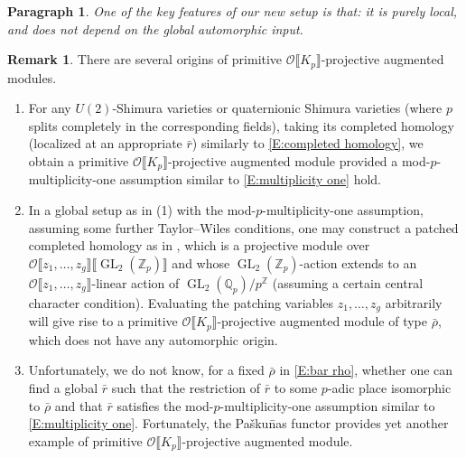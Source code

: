 \documentclass[12pt]{amsart}
\theoremstyle{definition}
\newtheorem{remark}[subsection]{Remark}
\newtheorem{para}[subsection]{Paragraph}
\numberwithin{equation}{subsection}
\def\calO{\mathcal{O}}
\def\QQ{\mathbb{Q}}
\def\ZZ{\mathbb{Z}}
\DeclareMathOperator{\GL}{GL}
\begin{document}
\begin{para}
\label{P:para_015}
{\it One of the key features of our new setup is that: it is purely local, and does not depend on the global automorphic input.}
\end{para}
\begin{remark}
\label{R:origins of arithmetic modules}
There are several origins of primitive $\calO\llbracket K_p\rrbracket$-projective augmented modules.
\begin{enumerate}
\item For any $U(2)$-Shimura varieties or quaternionic Shimura varieties (where $p$ splits completely in the corresponding fields), taking its completed homology (localized at an appropriate $\bar r$) similarly to \eqref{E:completed homology}, we obtain a primitive $\calO\llbracket K_p\rrbracket$-projective augmented module provided a mod-$p$-multiplicity-one assumption similar to \eqref{E:multiplicity one} hold.

\item 
In a global setup as in (1) with the mod-$p$-multiplicity-one assumption, assuming some further Taylor--Wiles conditions, one may construct a patched completed homology as in \cite[\S\,2]{six author}, which is a projective module over $\calO\llbracket z_1, \dots, z_g\rrbracket \llbracket \GL_2(\ZZ_p)\rrbracket$ and whose $\GL_2(\ZZ_p)$-action extends to an $\calO\llbracket z_1, \dots, z_g\rrbracket$-linear action of $\GL_2(\QQ_p)/p^\ZZ$ (assuming a certain central character condition). Evaluating the patching variables $z_1, \dots, z_g$ arbitrarily will give rise to a primitive $\calO\llbracket K_p\rrbracket$-projective augmented module of type $\bar\rho$, which does not have any automorphic origin. 

\item Unfortunately, we do not know, for a fixed $\bar \rho$ in \eqref{E:bar rho}, whether one can find a global $\bar r$ such that the restriction of $\bar r$ to some $p$-adic place isomorphic to $\bar \rho$ and that $\bar r$ satisfies the mod-$p$-multiplicity-one assumption similar to \eqref{E:multiplicity one}. Fortunately, the Pa\v sku\=nas functor provides yet another example of primitive $\calO\llbracket K_p\rrbracket$-projective augmented module.


\end{enumerate}
\end{remark}
\end{document}
